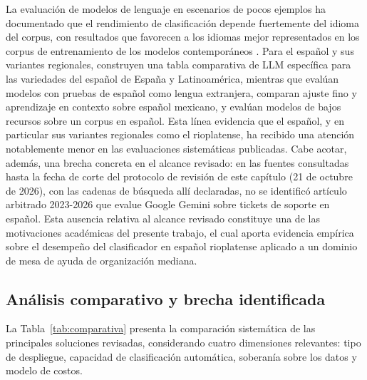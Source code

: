La evaluación de modelos de lenguaje en escenarios de pocos ejemplos ha documentado que el rendimiento de clasificación depende fuertemente del idioma del corpus, con resultados que favorecen a los idiomas mejor representados en los corpus de entrenamiento de los modelos contemporáneos \parencite{ahuja2023mega, lai2023okapi, zhang2023multilingual, xuan2025mmluprox}. Para el español y sus variantes regionales, \textcite{grandury2025laleaderboard} construyen una tabla comparativa de LLM específica para las variedades del español de España y Latinoamérica, mientras que \textcite{mayorrocher2026spanish} evalúan modelos con pruebas de español como lengua extranjera, \textcite{bernalbeltran2025mexicanspanish} comparan ajuste fino y aprendizaje en contexto sobre español mexicano, y \textcite{ramonferrer2026tripletotext} evalúan modelos de bajos recursos sobre un corpus en español. Esta línea evidencia que el español, y en particular sus variantes regionales como el rioplatense, ha recibido una atención notablemente menor en las evaluaciones sistemáticas publicadas. Cabe acotar, además, una brecha concreta en el alcance revisado: en las fuentes consultadas hasta la fecha de corte del protocolo de revisión de este capítulo (21 de octubre de 2026), con las cadenas de búsqueda allí declaradas, no se identificó artículo arbitrado 2023-2026 que evalue Google Gemini sobre tickets de soporte en español. Esta ausencia relativa al alcance revisado constituye una de las motivaciones académicas del presente trabajo, el cual aporta evidencia empírica sobre el desempeño del clasificador en español rioplatense aplicado a un dominio de mesa de ayuda de organización mediana.

\subsection{Análisis comparativo y brecha identificada}\label{subsec:analisis-comparativo}

La Tabla~\ref{tab:comparativa} presenta la comparación sistemática de las principales soluciones revisadas, considerando cuatro dimensiones relevantes: tipo de despliegue, capacidad de clasificación automática, soberanía sobre los datos y modelo de costos.


